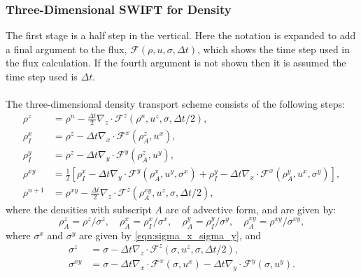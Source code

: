 \documentclass[11pt,a4paper]{article}
\begin{document}
\subsubsection{Three-Dimensional SWIFT for Density} \label{sec:3D_density}
The first stage is a half step in the vertical.
Here the notation is expanded to add a final argument to the flux, $\mathcal{F}(\rho,u,\sigma,\Delta{t})$, which shows the time step used in the flux calculation. If the fourth argument is not shown then it is assumed the time step used is $\Delta{t}$. \\
\\
The three-dimensional density transport scheme consists of the following steps:
\begin{subequations}
\begin{align}
\rho^z & = \rho^n - \tfrac{\Delta t}{2}\nabla_z \cdot \mathcal{F}^z\left(\rho^n, u^z, \sigma, \Delta t /2 \right), \\
\rho_I^x & = \rho^z - \Delta t \nabla_x \cdot \mathcal{F}^x\left(\rho^z_A, u^x \right), \\
\rho_I^y & = \rho^z - \Delta t \nabla_y \cdot \mathcal{F}^y\left(\rho^z_A, u^y \right), \\
\rho^{xy} & = \frac{1}{2}\left[\rho_I^x - \Delta t \nabla_y \cdot \mathcal{F}^y\left(\rho^x_A, u^y, \sigma^x \right) + \rho_I^y - \Delta t \nabla_x \cdot \mathcal{F}^x\left(\rho_A^y, u^x,\sigma^y\right)\right], \\
\rho^{n+1} & = \rho^{xy} - \tfrac{\Delta t}{2}\nabla_z\cdot\mathcal{F}^z\left(\rho_A^{xy},u^z,\sigma,\Delta t/2\right),
\end{align}
\end{subequations}
where the densities with subscript $A$ are of advective form, and are given by:
\begin{equation}
\rho^z_A = \rho^z / \sigma^z, \quad
\rho^x_A = \rho_I^x / \sigma^x, \quad
\rho^y_A = \rho_I^y / \sigma^y, \quad
\rho^{xy}_A = \rho^{xy} / \sigma^{xy},
\end{equation}
where $\sigma^x$ and $\sigma^y$ are given by \eqref{eqn:sigma_x_sigma_y}, and
\begin{subequations}
\begin{align}
\sigma^z & = \sigma - \Delta t \nabla_z \cdot \mathcal{F}^z(\sigma,u^z,\sigma,\Delta{t}/2), \\
\sigma^{xy} & = \sigma - \Delta{t} \nabla_x \cdot \mathcal{F}^x(\sigma,u^x) - \Delta{t} \nabla_y \cdot \mathcal{F}^y(\sigma,u^y).
\end{align}
\end{subequations}
\end{document}
